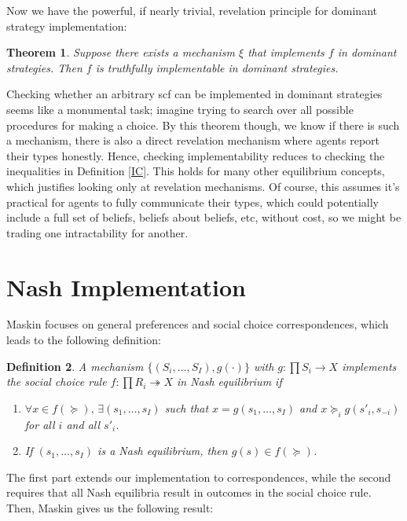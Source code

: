 \documentclass[letter, 10pt]{article}
\newtheorem{theorem}{Theorem}[section]
\newtheorem{definition}[theorem]{Definition}
\theoremstyle{definition}
\begin{document}
\begin{spacing}{1.1}
Now we have the powerful, if nearly trivial,
revelation principle for dominant strategy implementation:
\begin{theorem}
  Suppose there exists a mechanism $\xi$ that implements
  $f$ in dominant strategies. Then $f$ is truthfully
  implementable in dominant strategies.
\end{theorem}

Checking whether an arbitrary scf can be implemented in dominant strategies
seems like a monumental task; imagine trying to search over all possible
procedures for making a choice. By this theorem though, we know if there is
such a mechanism, there is also a direct revelation mechanism where
agents report their types honestly. Hence, checking implementability
reduces to checking the inequalities in Definition \ref{IC}. This
holds for many other equilibrium concepts, which justifies looking only at
revelation mechanisms. Of course, this assumes it's practical for agents to
fully communicate their types, which could potentially include a full set
of beliefs, beliefs about beliefs, etc, without cost, so we might be
trading one intractability for another.

\section{Nash Implementation}
\label{sec:nash-implementation}

Maskin focuses on general preferences and social choice correspondences,
which leads to the following definition:

\begin{definition}
  A mechanism $\{(S_i, \ldots, S_I), g(\cdot)\}$ with
  $g:\prod S_i \to X$ implements the social choice
  rule $f: \prod R_i \twoheadrightarrow X$ in Nash
  equilibrium if
  \begin{enumerate}
  \item $\forall x \in f(\succeq), \, \exists (s_1, \ldots,
    s_I)$ such that $x = g(s_1, \ldots, s_I)$ and $x \succeq_i g(s'_i, s_{-i})$ for all $i$ and all $s'_i$.
  \item If $(s_1, \ldots, s_I)$ is a Nash equilibrium,
    then $g(s) \in f(\succeq)$.
  \end{enumerate}

\end{definition}

The first part extends our implementation to
correspondences, while the second requires that all Nash
equilibria result in outcomes in the social choice
rule. Then, Maskin gives us the following result:


\end{spacing}
\end{document}
